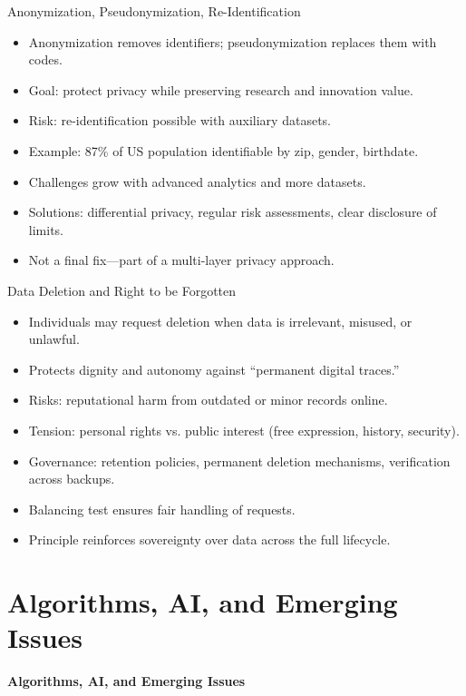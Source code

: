 \documentclass[aspectratio=169, table]{beamer}
\begin{document}
\begin{frame}{\LARGE{Anonymization, Pseudonymization, Re-Identification}}
	\vspace{20pt}
	\begin{itemize}
		\item Anonymization removes identifiers; pseudonymization replaces them with codes.  
		\item Goal: protect privacy while preserving research and innovation value.  
		\item Risk: re-identification possible with auxiliary datasets.  
		\item Example: 87\% of US population identifiable by zip, gender, birthdate.  
		\item Challenges grow with advanced analytics and more datasets.  
		\item Solutions: differential privacy, regular risk assessments, clear disclosure of limits.  
		\item Not a final fix—part of a multi-layer privacy approach.  
	\end{itemize}
\end{frame}

\begin{frame}{Data Deletion and Right to be Forgotten}
	\vspace{20pt}
	\begin{itemize}
		\item Individuals may request deletion when data is irrelevant, misused, or unlawful.  
		\item Protects dignity and autonomy against “permanent digital traces.”  
		\item Risks: reputational harm from outdated or minor records online.  
		\item Tension: personal rights vs. public interest (free expression, history, security).  
		\item Governance: retention policies, permanent deletion mechanisms, verification across backups.  
		\item Balancing test ensures fair handling of requests.  
		\item Principle reinforces sovereignty over data across the full lifecycle.  
	\end{itemize}
\end{frame}

\section{Algorithms, AI, and Emerging Issues}
\begin{frame}{\hfill}
	\centering
	\Huge{\textbf{Algorithms, AI, and Emerging Issues}}
\end{frame}
\end{document}
